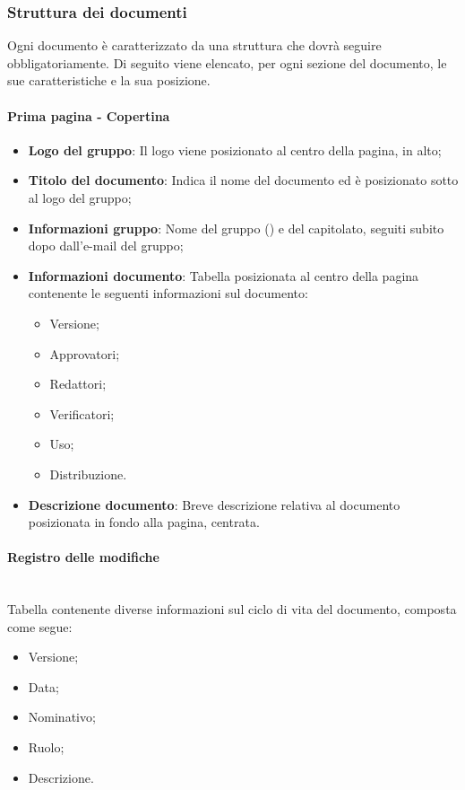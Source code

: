 \subsubsection{Struttura dei documenti}
Ogni documento è caratterizzato da una struttura che dovrà seguire obbligatoriamente.
Di seguito viene elencato, per ogni sezione del documento, le sue caratteristiche e la sua posizione.

\paragraph{Prima pagina - Copertina}\mbox{}
\begin{itemize}
\item \textbf{Logo del gruppo}: Il logo viene posizionato al centro della pagina, in alto;
\item \textbf{Titolo del documento}: Indica il nome del documento ed è posizionato sotto al logo del gruppo;
\item \textbf{Informazioni gruppo}: Nome del gruppo (\Gruppo{}) e del capitolato, seguiti subito dopo dall'e-mail del gruppo; 
\item \textbf{Informazioni documento}: Tabella posizionata al centro della pagina contenente le seguenti informazioni sul documento:
\begin{itemize}
\item Versione;
\item Approvatori;
\item Redattori;
\item Verificatori;
\item Uso;
\item Distribuzione.
\end{itemize}
\item \textbf{Descrizione documento}: Breve descrizione relativa al documento posizionata in fondo alla pagina, centrata.
\end{itemize}

\paragraph{Registro delle modifiche} \mbox{} \\
Tabella contenente diverse informazioni sul ciclo di vita del documento, composta come segue:
\begin{itemize}
\item Versione;
\item Data;
\item Nominativo;
\item Ruolo;
\item Descrizione.
\end{itemize}

